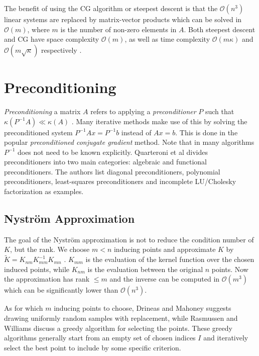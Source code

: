 \documentclass{article}
\theoremstyle{plain}
\theoremstyle{definition}
\theoremstyle{remark}
\begin{document}
The benefit of using the CG algorithm or steepest descent is that the $\mathcal{O}(n^3)$ linear systems are replaced by matrix-vector products which can be solved in $\mathcal{O}(m)$, where $m$ is the number of non-zero elements in $A$.
Both steepest descent and CG have space complexity $\mathcal{O}(m)$, as well as time complexity $\mathcal{O}(m \kappa)$ and $\mathcal{O} (m \sqrt{\kappa})$ respectively \cite{shewchuk}.

\section{Preconditioning}
\textit{Preconditioning} a matrix $A$ refers to applying a \textit{preconditioner} $P$ such that $\kappa(P^{-1}A) \ll \kappa(A)$ \cite{cutajar}.
Many iterative methods make use of this by solving the preconditioned system $P^{-1}Ax = P^{-1}b$ instead of $Ax = b$.
This is done in the popular \textit{preconditioned conjugate gradient} method.
Note that in many algorithms $P^{-1}$ does not need to be known explicitly.
Quarteroni et al \cite{quarteroni} divides preconditioners into two main categories: algebraic and functional preconditioners. The authors list diagonal preconditioners, polynomial preconditioners, least-squares preconditioners and incomplete LU/Cholesky factorization as examples.

\subsection{Nyström Approximation}
The goal of the Nyström approximation is not to reduce the condition number of $K$, but the rank.
We choose $m < n$ inducing points and approximate $K$ by $\tilde{K}  = K_{nm}K_{mm}^{-1}K_{mn}$ \cite{rasmussen}.
$K_{mm}$ is the evaluation of the kernel function over the chosen induced points, while $K_{nm}$ is the evaluation between the original $n$ points.
Now the approximation has rank $\leq m$ and the inverse can be computed in $\mathcal{O}(m^3)$ which can be significantly lower than $\mathcal{O}(n^3)$.

As for which $m$ inducing points to choose, Drineas and Mahoney \cite{drineas} suggests drawing uniformly random samples with replacement, while Rasmussen and Williams discuss a greedy algorithm for selecting the points.
These greedy algorithms generally start from an empty set of chosen indices $I$ and iteratively select the best point to include by some specific criterion.
\end{document}
